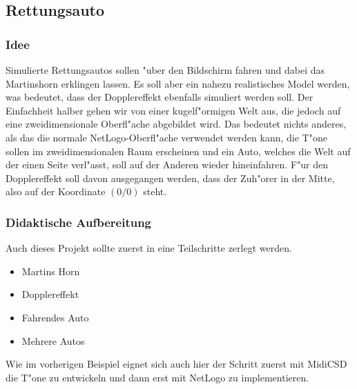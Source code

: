 \subsection{Rettungsauto}
\label{Bsp:Rettungsauto}
\subsubsection{Idee}
Simulierte Rettungsautos sollen "uber den Bildschirm fahren und dabei das Martinshorn
erklingen lassen. Es soll aber ein nahezu realistisches
Model werden, was bedeutet, dass der Dopplereffekt ebenfalls simuliert
werden soll. Der Einfachheit halber gehen wir von einer kugelf"ormigen Welt aus,
die jedoch auf eine zweidimensionale Oberfl"ache abgebildet wird. Das bedeutet
nichts anderes, als das die normale NetLogo-Oberfl"ache verwendet werden kann,
die T"one sollen im zweidimensionalen Raum erscheinen und ein Auto, welches die
Welt auf der einen Seite verl"asst, soll auf der Anderen wieder hineinfahren. 
F"ur den Dopplereffekt soll davon ausgegangen werden, dass der Zuh"orer in
der Mitte, also auf der Koordinate $(0/0)$ steht. 

\subsubsection{Didaktische Aufbereitung}
Auch dieses Projekt sollte zuerst in eine Teilschritte zerlegt werden.
\begin{itemize}
\item Martins Horn
\item Dopplereffekt
\item Fahrendes Auto
\item Mehrere Autos
\end{itemize}
Wie im vorherigen Beispiel eignet sich auch hier der Schritt zuerst mit
MidiCSD die T"one zu entwickeln und dann erst mit NetLogo zu implementieren.

